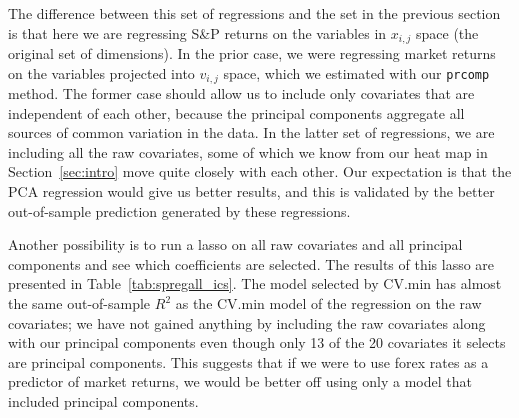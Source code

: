 \documentclass[11pt, fleqn]{article}
\begin{document}
The difference between this set of regressions and the set in the previous section is that here we are regressing S\&P returns on the variables in $x_{i,j}$ space (the original set of dimensions). In the prior case, we were regressing market returns on the variables projected into $v_{i,j}$ space, which we estimated with our \texttt{prcomp} method. The former case should allow us to include only covariates that are independent of each other, because the principal components aggregate all sources of common variation in the data. In the latter set of regressions, we are including all the raw covariates, some of which we know from our heat map in Section~\ref{sec:intro} move quite closely with each other. Our expectation is that the PCA regression would give us better results, and this is validated by the better out-of-sample prediction generated by these regressions.



Another possibility is to run a lasso on all raw covariates and all principal components and see which coefficients are selected. The results of this lasso are presented in Table~\ref{tab:spregall_ics}. The model selected by CV.min has almost the same out-of-sample $R^2$ as the CV.min model of the regression on the raw covariates; we have not gained anything by including the raw covariates along with our principal components even though only 13 of the 20 covariates it selects are principal components. This suggests that if we were to use forex rates as a predictor of market returns, we would be better off using only a model that included principal components.


\end{document}
